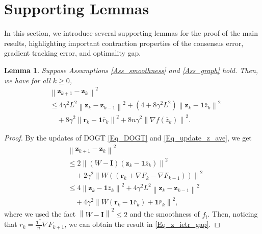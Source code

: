 \documentclass[10pt,a4paper]{amsart}
\newtheorem{Lem}{Lemma}
\begin{document}
\section{Supporting Lemmas}
In this section, we introduce several supporting lemmas for the proof of the main results, highlighting important contraction properties of the consensus error, gradient tracking error, and optimality gap.

\begin{Lem}\label{Lem_z_iter_gap}
Suppose Assumptions \ref{Ass_smoothness} and \ref{Ass_graph} hold. Then, we have for all $ k \geqslant 0$,
\begin{equation}\label{Eq_z_ietr_gap}
\begin{aligned}
&\left\| \mathbf{z}_{k+1}-\mathbf{z}_k \right\| ^2
\\
&\leqslant 4\gamma ^2L^2\left\| \mathbf{z}_k-\mathbf{z}_{k-1} \right\| ^2+\left( 4+8\gamma ^2L^2 \right) \left\| \mathbf{z}_k-\mathbf{1}\bar{z}_k \right\| ^2
\\
 &\quad+8\gamma ^2\left\| \mathbf{r}_k-\mathbf{1}\bar{r}_k \right\| ^2+8n\gamma ^2\left\| \nabla f\left( \bar{z}_k \right) \right\| ^2.
\end{aligned}
\end{equation}
\end{Lem}

\begin{proof}
By the updates of DOGT \eqref{Eq_DOGT} and \eqref{Eq_update_z_ave}, we get
\begin{equation*}
\begin{aligned}
&\left\| \mathbf{z}_{k+1}-\mathbf{z}_k \right\| ^2
\\
&\leqslant 2\left\| \left( W-\mathbf{I} \right) \left( \mathbf{z}_k-\mathbf{1}\bar{z}_k \right) \right\| ^2
\\
&\quad +2\gamma ^2\left\| W\left( \left( \mathbf{r}_k+\nabla F_k-\nabla F_{k-1} \right) \right) \right\| ^2
\\
&\leqslant 4\left\| \mathbf{z}_k-\mathbf{1}\bar{z}_k \right\| ^2+4\gamma ^2L^2\left\| \mathbf{z}_k-\mathbf{z}_{k-1} \right\| ^2
\\
&\quad +4\gamma ^2\left\| W\left( \mathbf{r}_k-\mathbf{1}\bar{r}_k \right) +\mathbf{1}\bar{r}_k \right\| ^2,
\end{aligned}
\end{equation*}
where we used the fact $\left\| W-\mathbf{I} \right\| ^2\leqslant 2$ and the smoothness of $f_i$.
Then, noticing that $\bar{r}_k=\frac{\mathbf{1}^{\top}}{n}\nabla F_{k+1}$, we can obtain the result in \eqref{Eq_z_ietr_gap}.
\end{proof}
\end{document}
